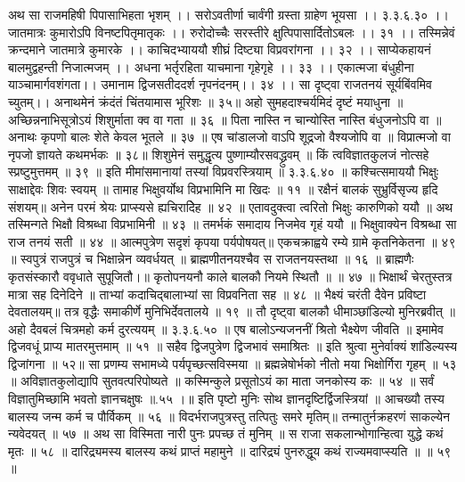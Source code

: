 अथ सा राजमहिषी पिपासाभिहता भृशम् ।।
सरोऽवतीर्णा चार्वंगी ग्रस्ता ग्राहेण भूयसा ।। ३.३.६.३० ।।
जातमात्रः कुमारोऽपि विनष्टपितृमातृकः ।।
रुरोदोच्चैः सरस्तीरे क्षुत्पिपासार्दितोऽबलः ।। ३१ ।।
तस्मिन्नेवं क्रन्दमाने जातमात्रे कुमारके ।।
काचिदभ्याययौ शीघ्रं दिष्ट्या विप्रवरांगना ।। ३२ ।।
साप्येकहायनं बालमुद्वहन्ती निजात्मजम् ।।
अधना भर्तृरहिता याचमाना गृहेगृहे ।। ३३ ।।
एकात्मजा बंधुहीना याञ्चामार्गवशंगता।।
उमानाम द्विजसतीददर्श नृपनंदनम्।। ३४ ।।
सा दृष्ट्वा राजतनयं सूर्यबिंवमिव च्युतम्।।
अनाथमेनं क्रंदंतं चिंतयामास भूरिशः ॥ ३५॥
अहो सुमहदाश्चर्यमिदं दृष्टं मयाधुना ॥
अच्छिन्ननाभिसूत्रोऽयं शिशुर्माता क्व वा गता ॥ ३६ ॥
पिता नास्ति न चान्योस्ति नास्ति बंधुजनोऽपि वा ॥
अनाथः कृपणो बालः शेते केवल भूतले ॥ ३७ ॥
एष चांडालजो वाऽपि शूद्रजो वैश्यजोपि वा ॥
विप्रात्मजो वा नृपजो ज्ञायते कथमर्भकः ॥ ३८॥
शिशुमेनं समुद्धृत्य पुष्णाम्यौरसवद्ध्रुवम् ॥
किं त्वविज्ञातकुलजं नोत्सहे स्प्रष्टुमुत्तमम् ॥ ३९ ॥
इति मीमांसमानायां तस्यां विप्रवरस्त्रियाम् ॥ ३.३.६.४० ॥
कश्चित्समाययौ भिक्षुः साक्षाद्देवः शिवः स्वयम् ॥
तामाह भिक्षुवर्योथ विप्रभामिनि मा खिदः ॥ ११ ॥
रक्षैनं बालकं सुभ्रुर्विसृज्य हृदि संशयम्॥
अनेन परमं श्रेयः प्राप्स्यसे ह्यचिरादेिह ॥ ४२ ॥
एतावदुक्त्वा त्वरितो भिक्षुः कारुणिको ययौ ॥
अथ तस्मिन्गते भिक्षौ विश्रब्धा विप्रभामिनी ॥ ४३ ॥
तमर्भकं समादाय निजमेव गृहं ययौ ॥
भिक्षुवाक्येन विश्रब्धा सा राज तनयं सती ॥ ४४ ॥
आत्मपुत्रेण सदृशं कृपया पर्यपोषयत्॥
एकचक्राह्वये रम्ये ग्रामे कृतनिकेतना ॥ ४९ ॥
स्वपुत्रं राजपुत्रं च भिक्षान्नेन व्यवर्धयत् ॥
ब्राह्मणीतनयश्चैव स राजतनयस्तथा ॥ १६ ॥
ब्राह्मणैः कृतसंस्कारौ ववृधाते सुपूजितौ।॥
कृतोपनयनौ काले बालकौ नियमे स्थितौ ॥ ॥ ४७ ॥
भिक्षार्थं चेरतुस्तत्र मात्रा सह दिनेदिने ॥
ताभ्यां कदाचिद्बालाभ्यां सा विप्रवनिता सह ॥ ४८ ॥
भैक्ष्यं चरंती दैवेन प्रविष्टा देवतालयम्॥
तत्र वृद्धैः समाकीर्णे मुनिभिर्देवतालये ॥ १९ ॥
तौ दृष्ट्वा बालकौ धीमाञ्छांडिल्यो मुनिरब्रवीत् ॥
अहो दैवबलं चित्रमहो कर्म दुरत्ययम् ॥ ३.३.६.५० ॥
एष बालोऽन्यजननीं श्रितो भैक्ष्येण जीवति ॥
इमामेव द्विजवधूं प्राप्य मातरमुत्तमाम् ॥ ५१ ॥
सहैव द्विजपुत्रेण द्विजभावं समाश्रितः ॥
इति श्रुत्वा मुनेर्वाक्यं शांडिल्यस्य द्विजांगना ॥ ५२॥
सा प्रणम्य सभामध्ये पर्यपृच्छत्सविस्मया ॥
ब्रह्मन्नेषोर्भको नीतो मया भिक्षोर्गिरा गृहम् ॥ ५३ ॥
अविज्ञातकुलोद्यापि सुतवत्परिपोष्यते ॥
कस्मिन्कुले प्रसूतोऽयं का माता जनकोस्य कः ॥ ५४ ॥
सर्वं विज्ञातुमिच्छामि भवतो ज्ञानचक्षुषः ॥.५५ ।॥
इति पृष्टो मुनिः सोथ ज्ञानदृष्टिर्द्विजस्त्रियां ॥
आचख्यौ तस्य बालस्य जन्म कर्म च पौर्विकम् ॥ ५६ ॥
विदर्भराजपुत्रस्तु तत्पितुः समरे मृतिम्॥
तन्मातुर्नक्रहरणं साकल्येन न्यवेदयत् ॥ ५७ ॥
अथ सा विस्मिता नारी पुनः प्रपच्छ तं मुनिम् ॥
स राजा सकलान्भोगान्हित्वा युद्धे कथं मृतः ॥ ५८ ॥
दारिद्र्यमस्य बालस्य कथं प्राप्तं महामुने ॥
दारिद्र्यं पुनरुद्धूय कथं राज्यमवाप्स्यति ॥ ॥ ५९ ॥
